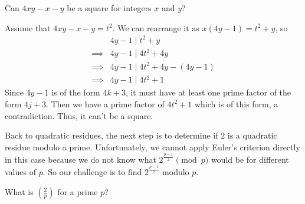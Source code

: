 \documentclass[main.tex]{subfile}
\begin{document}
	\begin{problem}
		Can $4xy-x-y$ be a square for integers $x$ and $y$?
	\end{problem}

	\begin{solution}
		Assume that $4xy-x-y=t^2$. We can rearrange it as $x(4y-1)  = t^2+y$, so
			\begin{align*}
				&4y-1  \mid t^2+y\\
				\implies &4y-1  \mid 4t^2+4y\\
				\implies &4y-1  \mid 4t^2+4y-(4y-1)\\
				\implies &4y-1  \mid 4t^2+1
			\end{align*}
		Since $4y-1$ is of the form $4k+3$, it must have at least one prime factor of the form $4j+3$. Then we have a prime factor of $4t^2+1$ which is of this form, a contradiction. Thus, it can't be a square.
	\end{solution}
Back to quadratic residues, the next step is to determine if $2$ is a quadratic residue modulo a prime. Unfortunately, we cannot apply Euler's criterion directly in this case because we do not know what $2^\frac{p-1}{2} \pmod p$ would be for different values of $p$. So our challenge is to find $2^\frac{p-1}{2}$ modulo $p$.

	\begin{problem}\label{pr:qr2p}
		What is $ \left(\frac{2}{p}\right)$ for a prime $p$?
	\end{problem}
\end{document}
